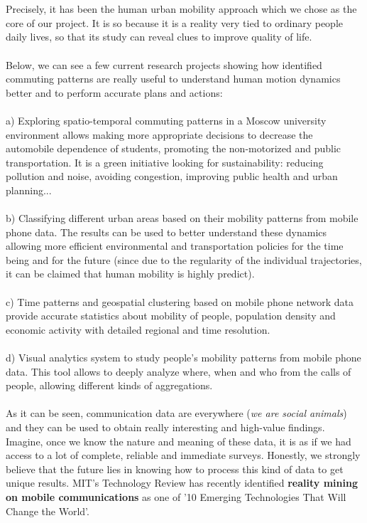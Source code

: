 \\
\\
Precisely, it has been the human urban mobility approach which we chose as the core of our project. It is so because it is a reality very tied to ordinary people daily lives, so that its study can reveal clues to improve quality of life.
\\
\\
Below, we can see a few current research projects showing how identified commuting patterns are really useful to understand human motion dynamics better and to perform accurate plans and actions:
\\
\\
a) Exploring spatio-temporal commuting patterns in a Moscow university environment allows making more appropriate decisions to decrease the automobile dependence of students, promoting the non-motorized and public transportation. It is a green initiative looking for sustainability: reducing pollution and noise, avoiding congestion, improving public health and urban planning...
\\
\\
b) Classifying different urban areas based on their mobility patterns from mobile phone data. The results can be used to better understand these dynamics allowing more efficient environmental and transportation policies for the time being and for the future (since due to the regularity of the individual trajectories, it can be claimed that human mobility is highly predict).
\\
\\
c) Time patterns and geospatial clustering based on mobile phone network data provide accurate statistics about mobility of people, population density and economic activity with detailed regional and time resolution.
\\
\\
d) Visual analytics system to study people's mobility patterns from mobile phone data. This tool allows to deeply analyze where, when and who from the calls of  people, allowing different kinds of aggregations.
\\
\\
As it can be seen, communication data are everywhere ({\it we are social animals}) and they can be used to obtain really interesting and high-value findings. Imagine, once we know the nature and meaning of these data, it is as if we had access to a lot of complete, reliable and immediate surveys. Honestly, we strongly believe that the future lies in knowing how to process this kind of data to get unique results. MIT's Technology Review has recently identified {\bf reality mining on mobile communications} as one of '10 Emerging Technologies That Will Change the World'.
